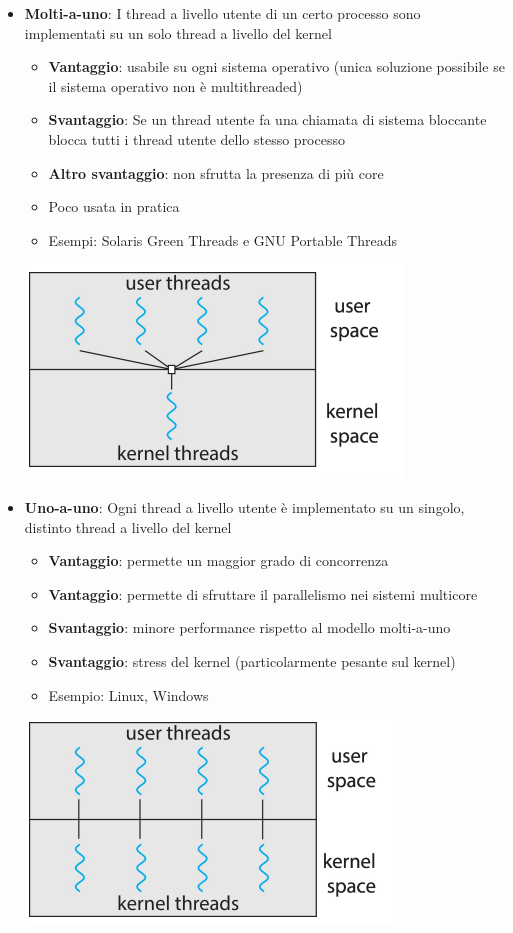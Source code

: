 \documentclass[12pt]{article}
\begin{document}
\begin{itemize}
    \item \textbf{Molti-a-uno}: I thread a livello utente di un certo processo sono implementati su un solo thread a livello del kernel
    \begin{itemize}
        \item \textbf{Vantaggio}: usabile su ogni sistema operativo (unica soluzione possibile se il sistema operativo non è multithreaded)
        \item \textbf{Svantaggio}: Se un thread utente fa una chiamata di sistema bloccante blocca tutti i thread utente dello stesso processo
        \item \textbf{Altro svantaggio}: non sfrutta la presenza di più core
        \item Poco usata in pratica
        \item Esempi: Solaris Green Threads e GNU Portable Threads
    \end{itemize}
    \begin{center}
        \includegraphics[width = 0.40\linewidth]{Images/42.png}
    \end{center}
    \item \textbf{Uno-a-uno}: Ogni thread a livello utente è implementato su un singolo, distinto thread a livello del kernel
    \begin{itemize}
        \item \textbf{Vantaggio}: permette un maggior grado di concorrenza
        \item \textbf{Vantaggio}: permette di sfruttare il parallelismo nei sistemi multicore
        \item \textbf{Svantaggio}: minore performance rispetto al modello molti-a-uno
        \item \textbf{Svantaggio}: stress del kernel (particolarmente pesante sul kernel)
        \item Esempio: Linux, Windows
    \end{itemize}
    \begin{center}
        \includegraphics[width = 0.40\linewidth]{Images/43.png}

\end{center}
\end{itemize}
\end{document}
